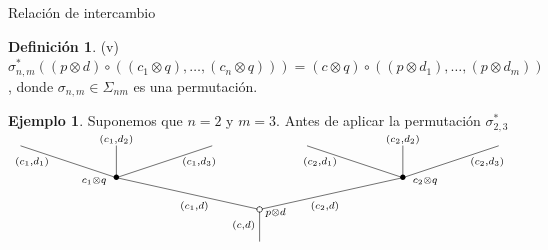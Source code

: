 \documentclass[12pt,aspectratio=169]{beamer}
\numberwithin{equation}{section}
\theoremstyle{definition}
\newtheorem{defi}[teo]{Definici\'on}
\newtheorem{ex}[teo]{Ejemplo}
\begin{document}
\begin{frame}{Relaci\'on de intercambio}
    \begin{defi}
        (v) $\sigma_{n,m}^{*}((p\otimes d)\circ((c_1\otimes q),\dots,(c_n\otimes q))) = (c\otimes q)\circ((p\otimes d_1),\dots,(p\otimes d_m))$, donde $\sigma_{n,m}\in\Sigma_{nm}$ es una permutaci\'on.
    \end{defi}

    \begin{ex}
        Suponemos que $n=2$ y $m=3$.
        Antes de aplicar la permutaci\'on $\sigma_{2,3}^{*}$
        \begin{equation}
            \xy
            <0.08cm, 0cm>:
            (0.0, 0.0)*{}="1"; %
            (0.0, 10.0)*\cir<2pt>{}="2"; %
            (-45.0, 20.0)*=0{\bullet}="3"; %
            (-75.0, 30.0)*{}="4"; %
            (-45.0, 30.0)*{}="5"; %
            (-15.0, 30.0)*{}="6"; %
            (45.0, 20.0)*=0{\bullet}="7"; %
            (15.0, 30.0)*{}="8"; %
            (45.0, 30.0)*{}="9"; %
            (75.0, 30.0)*{}="10"; %
            "1";"2" **\dir{-};
            "2";"3" **\dir{-};
            "3";"4" **\dir{-};
            "3";"5" **\dir{-};
            "3";"6" **\dir{-};
            "2";"7" **\dir{-};
            "7";"8" **\dir{-};
            "7";"9" **\dir{-};
            "7";"10" **\dir{-};
            (5.0, 9.0)*=0{\scriptstyle p\otimes d};
            (-52.0, 19.0)*=0{\scriptstyle c_1\otimes q};
            (52.0, 19.0)*=0{\scriptstyle c_2\otimes q};
            (-5.0, 5.0)*=0{\scriptstyle (c,d)};
            (-20.5, 11.0)*=0{\scriptstyle (c_1,d)};
            (-71.5, 25.0)*=0{\scriptstyle (c_1,d_1)};
            (-45.0, 32.0)*=0{\scriptstyle (c_1,d_2)};
            (-19.0, 25.0)*=0{\scriptstyle (c_1,d_3)};
            (20.5, 11.0)*=0{\scriptstyle (c_2,d)};
            (19.0, 25.0)*=0{\scriptstyle (c_2,d_1)};
            (45.0, 32.0)*=0{\scriptstyle (c_2,d_2)};
            (71.5, 25.0)*=0{\scriptstyle (c_2,d_3)};
            \endxy
        \end{equation}
    \end{ex}
\end{frame}
\end{document}
